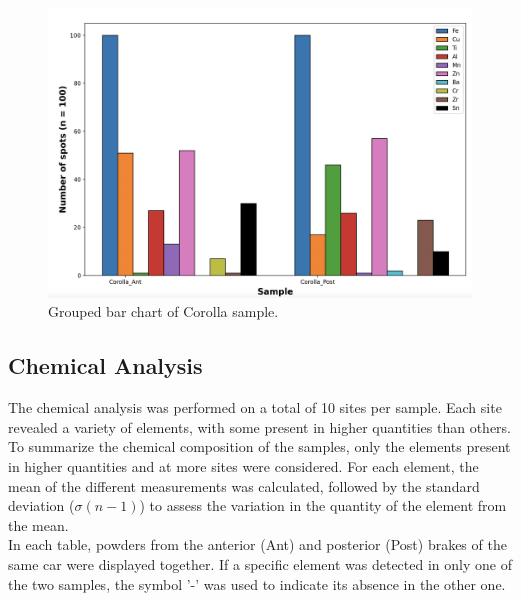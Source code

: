 \begin{figure}[H]
\centering
    \includegraphics[scale=0.27]{images/Corolla_HM.png}
    \caption{Grouped bar chart of Corolla sample.}
    \label{fig:Corolla_HM}
\end{figure} 

\subsection{Chemical Analysis}

The chemical analysis was performed on a total of 10 sites per sample. Each site revealed a variety of elements, with some present in higher quantities than others. \\
To summarize the chemical composition of the samples, only the elements present in higher quantities and at more sites were considered. For each element, the mean of the different measurements was calculated, followed by the standard deviation ($\sigma (n-1)$) to assess the variation in the quantity of the element from the mean.\\
In each table, powders from the anterior (Ant) and posterior (Post) brakes of the same car were displayed together. If a specific element was detected in only one of the two samples, the symbol '-' was used to indicate its absence in the other one.

